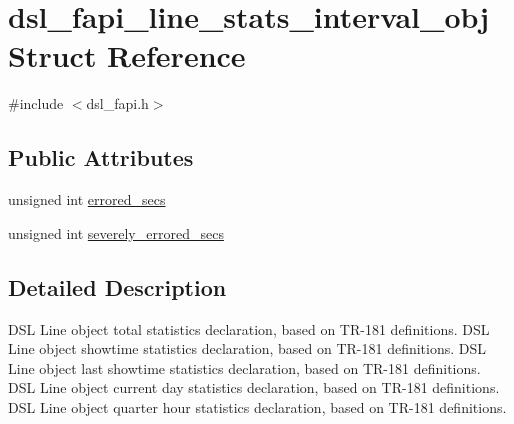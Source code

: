 \hypertarget{structdsl__fapi__line__stats__interval__obj}{\section{dsl\-\_\-fapi\-\_\-line\-\_\-stats\-\_\-interval\-\_\-obj Struct Reference}
\label{structdsl__fapi__line__stats__interval__obj}
}


{\ttfamily \#include $<$dsl\-\_\-fapi.\-h$>$}

\subsection*{Public Attributes}
\begin{DoxyCompactItemize}
\item 
unsigned int \hyperlink{structdsl__fapi__line__stats__interval__obj_ab7bf52b973364ae7b0c254ef31ab18a8}{errored\-\_\-secs}
\item 
unsigned int \hyperlink{structdsl__fapi__line__stats__interval__obj_aa33dade3d0503936c3f3cabc64447b8e}{severely\-\_\-errored\-\_\-secs}
\end{DoxyCompactItemize}


\subsection{Detailed Description}
D\-S\-L Line object total statistics declaration, based on T\-R-\/181 definitions. D\-S\-L Line object showtime statistics declaration, based on T\-R-\/181 definitions. D\-S\-L Line object last showtime statistics declaration, based on T\-R-\/181 definitions. D\-S\-L Line object current day statistics declaration, based on T\-R-\/181 definitions. D\-S\-L Line object quarter hour statistics declaration, based on T\-R-\/181 definitions. 

